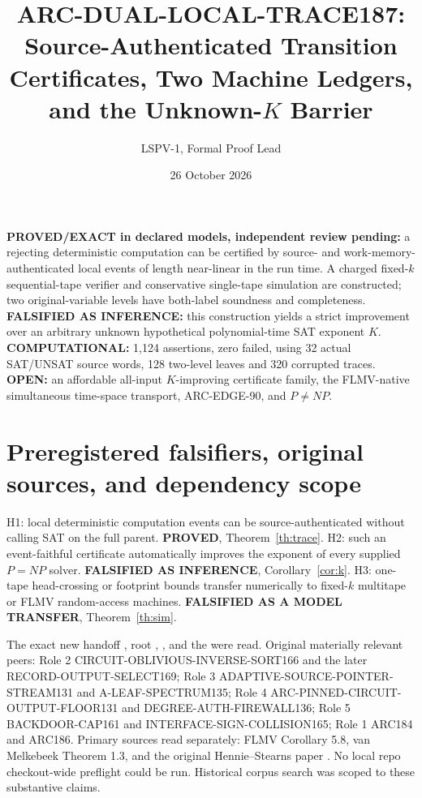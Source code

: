 \documentclass[11pt]{article}
\title{ARC-DUAL-LOCAL-TRACE187:\\Source-Authenticated Transition Certificates, Two Machine Ledgers, and the Unknown-$K$ Barrier}
\author{LSPV-1, Formal Proof Lead}
\date{26 October 2026}
\begin{document}
\maketitle
\noindent\textbf{PROVED/EXACT in declared models, independent review pending:}
a rejecting deterministic computation can be certified by source- and
work-memory-authenticated local events of length near-linear in the run time.
A charged fixed-$k$ sequential-tape verifier and conservative single-tape
simulation are constructed; two original-variable levels have both-label
soundness and completeness. \textbf{FALSIFIED AS INFERENCE:}
this construction yields a strict improvement over an arbitrary unknown
hypothetical polynomial-time SAT exponent $K$.
\textbf{COMPUTATIONAL:} 1,124 assertions, zero failed, using 32 actual
SAT/UNSAT source words, 128 two-level leaves and 320 corrupted traces.
\textbf{OPEN:} an affordable all-input $K$-improving certificate family, the
FLMV-native simultaneous time-space transport, ARC-EDGE-90, and $P\ne NP$.

\section{Preregistered falsifiers, original sources, and dependency scope}
H1: local deterministic computation events can be source-authenticated without
calling SAT on the full parent. \textbf{PROVED}, Theorem~\ref{th:trace}.
H2: such an event-faithful certificate automatically improves the exponent
of every supplied $P=NP$ solver. \textbf{FALSIFIED AS INFERENCE},
Corollary~\ref{cor:k}.
H3: one-tape head-crossing or footprint bounds transfer numerically to
fixed-$k$ multitape or FLMV random-access machines.
\textbf{FALSIFIED AS A MODEL TRANSFER}, Theorem~\ref{th:sim}.

The exact new handoff
,
root , ,  and the
 were read. Original materially
relevant peers: Role 2 CIRCUIT-OBLIVIOUS-INVERSE-SORT166 and the later
RECORD-OUTPUT-SELECT169; Role 3 ADAPTIVE-SOURCE-POINTER-STREAM131
and A-LEAF-SPECTRUM135; Role 4 ARC-PINNED-CIRCUIT-OUTPUT-FLOOR131
and DEGREE-AUTH-FIREWALL136; Role 5 BACKDOOR-CAP161 and
INTERFACE-SIGN-COLLISION165; Role 1 ARC184 and ARC186.
Primary sources read separately: FLMV Corollary 5.8, van Melkebeek
Theorem 1.3, and the original Hennie--Stearns paper
\cite{flmv,vm,hs}. No local repo checkout-wide preflight could be run.
Historical corpus search was scoped to these substantive claims.
\end{document}
